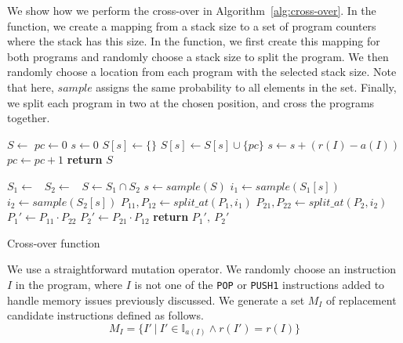   We show how we perform the cross-over in Algorithm~\ref{alg:cross-over}. In the  function, we create a mapping from a stack size to a set of program counters where the stack has this size. In the  function, we first create this mapping for both programs and randomly choose a stack size to split the program. We then randomly choose a location from each program with the selected stack size. Note that here, $sample$ assigns the same probability to all elements in the set. Finally, we split each program in two at the chosen position, and cross the programs together.

  \begin{algorithm}
    \begin{algorithmic}
      \State $S \gets $ 
      \State $pc \gets 0$
      \State $s \gets 0$
      \State $S[s] \gets \{\}$
      \EndIf
      \State $S[s] \gets S[s] \cup \{pc\}$
      \State $s \gets s + (r(I) - a(I))$
      \State $pc \gets pc + 1$
      \EndFor
      \State \textbf{return} $S$
      \EndFunction

      \State $S_1 \gets$~
      \State $S_2 \gets$~
      \State $S \gets S_1 \cap S_2$
      \State $s \gets sample(S)$
      \State $i_1 \gets sample(S_1[s])$
      \State $i_2 \gets sample(S_2[s])$
      \State $P_{11}, P_{12} \gets split\_at(P_1, i_1)$
      \State $P_{21}, P_{22} \gets split\_at(P_2, i_2)$
      \State $P_1' \gets P_{11}\cdot P_{22}$
      \State $P_2' \gets P_{21}\cdot P_{12}$
      \State \textbf{return} $P_1',~P_2'$
      \EndFunction
    \end{algorithmic}
    \caption{Cross-over function}
    \label{alg:cross-over}
  \end{algorithm}

  We use a straightforward mutation operator. We randomly choose an instruction $I$ in the program,  where $I$ is not one of the \lstinline{POP} or \lstinline{PUSH1} instructions added to handle memory issues previously discussed. We generate a set $M_I$ of replacement candidate instructions defined as follows.
  \begin{equation}
    \label{ref:mutation-set}
    M_I = \{ I'~|~I'\in \mathbb{I}_{a(I)}\land r(I') = r(I) \}
  \end{equation}

